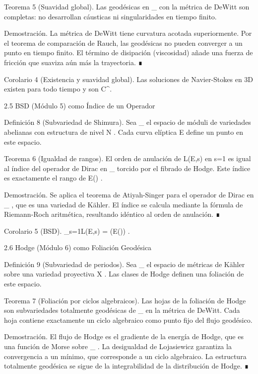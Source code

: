 \documentclass[12pt,a4paper]{book}
\begin{document}
Teorema 5 (Suavidad global). Las geodésicas en  _{}  con la métrica de DeWitt son completas: no desarrollan cáusticas ni singularidades en tiempo finito.

Demostración. La métrica de DeWitt tiene curvatura acotada superiormente. Por el teorema de comparación de Rauch, las geodésicas no pueden converger a un punto en tiempo finito. El término de disipación (viscosidad) añade una fuerza de fricción que suaviza aún más la trayectoria. ∎

Corolario 4 (Existencia y suavidad global). Las soluciones de Navier-Stokes en 3D existen para todo tiempo y son  C^\infty .

2.5 BSD (Módulo 5) como Índice de un Operador

Definición 8 (Subvariedad de Shimura). Sea  _{} \subset {}  el espacio de móduli de variedades abelianas con estructura de nivel  N . Cada curva elíptica  E  define un punto en este espacio.

Teorema 6 (Igualdad de rangos). El orden de anulación de  L(E,s)  en  s=1  es igual al índice del operador de Dirac en  _{}  torcido por el fibrado de Hodge. Este índice es exactamente el rango de  E() .

Demostración. Se aplica el teorema de Atiyah-Singer para el operador de Dirac en  _{} , que es una variedad de Kähler. El índice se calcula mediante la fórmula de Riemann-Roch aritmética, resultando idéntico al orden de anulación. ∎

Corolario 5 (BSD).  _{s=1}L(E,s) = (E()) .

2.6 Hodge (Módulo 6) como Foliación Geodésica

Definición 9 (Subvariedad de periodos). Sea  _{} \subset {}  el espacio de métricas de Kähler sobre una variedad proyectiva  X . Las clases de Hodge definen una foliación de este espacio.

Teorema 7 (Foliación por ciclos algebraicos). Las hojas de la foliación de Hodge son subvariedades totalmente geodésicas de  _{}  en la métrica de DeWitt. Cada hoja contiene exactamente un ciclo algebraico como punto fijo del flujo geodésico.

Demostración. El flujo de Hodge es el gradiente de la energía de Hodge, que es una función de Morse sobre  _{} . La desigualdad de Lojasiewicz garantiza la convergencia a un mínimo, que corresponde a un ciclo algebraico. La estructura totalmente geodésica se sigue de la integrabilidad de la distribución de Hodge. ∎
\end{document}
